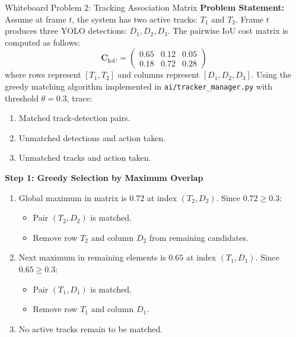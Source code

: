 \begin{interviewq}{Whiteboard Problem 2: Tracking Association Matrix}
\textbf{Problem Statement:}
Assume at frame $t$, the system has two active tracks: $T_1$ and $T_2$. Frame $t$ produces three YOLO detections: $D_1, D_2, D_3$. The pairwise IoU cost matrix is computed as follows:
\begin{equation*}
\mathbf{C}_{\text{IoU}} =
\begin{pmatrix}
0.65 & 0.12 & 0.05 \\
0.18 & 0.72 & 0.28
\end{pmatrix}
\end{equation*}
where rows represent $[T_1, T_2]$ and columns represent $[D_1, D_2, D_3]$. Using the greedy matching algorithm implemented in \texttt{ai/tracker\_manager.py} with threshold $\theta = 0.3$, trace:
\begin{enumerate}
    \item Matched track-detection pairs.
    \item Unmatched detections and action taken.
    \item Unmatched tracks and action taken.
\end{enumerate}
\tcblower
\textbf{Step 1: Greedy Selection by Maximum Overlap}
\begin{enumerate}
    \item Global maximum in matrix is $\mathbf{0.72}$ at index $(T_2, D_2)$. Since $0.72 \ge 0.3$:
    \begin{itemize}
        \item Pair $(T_2, D_2)$ is matched.
        \item Remove row $T_2$ and column $D_2$ from remaining candidates.
    \end{itemize}
    \item Next maximum in remaining elements is $\mathbf{0.65}$ at index $(T_1, D_1)$. Since $0.65 \ge 0.3$:
    \begin{itemize}
        \item Pair $(T_1, D_1)$ is matched.
        \item Remove row $T_1$ and column $D_1$.
    \end{itemize}
    \item No active tracks remain to be matched.
\end{enumerate}


\end{interviewq}
